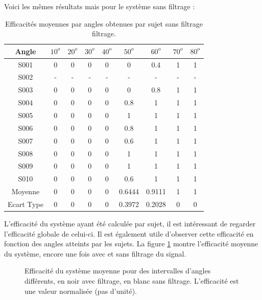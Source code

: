 \documentclass[letterpaper, twoside, 12pt, memoire, creativecommons, hyperref]{thETS}
\begin{document}
Voici les mêmes résultats mais pour le système sans filtrage :

\begin{table}[ht]
	\caption{Efficacités moyennes par angles obtenues par sujet sans filtrage filtrage. }
		\begin{tabular}{|c|c|c|c|c|c|c|c|c|}
		\hline
			Angle & $10^{o}$ & $20^{o}$ & $30^{o}$ & $40^{o}$ & $50^{o}$ & $60^{o}$ & $70^{o}$ & $80^{o}$\\
	    \hline
	    		S001 & 0 & 0 & 0 & 0 & 0 & 0.4 & 1 & 1\\
	    \hline
			S002 & - & - & - & - & - & - & - & -\\
	    \hline
	    		S003 & 0 & 0 & 0 & 0 & 0 & 0.8 & 1 & 1\\
	    \hline
	    		S004 & 0 & 0 & 0 & 0 & 0.8 & 1 & 1 & 1\\
	    \hline
	    		S005 & 0 & 0 & 0 & 0 & 1 & 1 & 1 & 1\\
	    \hline
	    		S006 & 0 & 0 & 0 & 0 & 0.8 & 1 & 1 & 1\\
	    \hline
	    		S007 & 0 & 0 & 0 & 0 & 0.6 & 1 & 1 & 1\\
	    \hline
	    		S008 & 0 & 0 & 0 & 0 & 1 & 1 & 1 & 1\\
	    \hline
	    		S009 & 0 & 0 & 0 & 0 & 1 & 1 & 1 & 1\\
	    \hline
	    		S010 & 0 & 0 & 0 & 0 & 0.6 & 1 & 1 & 1\\
	    \hline
	    		Moyenne & 0 & 0 & 0 & 0 & 0.6444 & 0.9111 & 1 & 1\\
	    \hline
	    		Ecart Type & 0 & 0 & 0 & 0 & 0.3972 & 0.2028 & 0 & 0\\
	    \hline
		\end{tabular}
	\label{tab:effFangles}
\end{table}

L'efficacité du système ayant été calculée par sujet, il est intéressant de regarder l'efficacité globale de celui-ci. Il est également utile d'observer cette efficacité en fonction des angles atteints par les sujets. La figure \ref{fig:compeff} montre l'efficacité moyenne du système, encore une fois avec et sans filtrage du signal. 

\begin{figure}
	\centering
	\caption{Efficacité du système moyenne pour des intervalles d'angles différents, en noir avec filtrage, en blanc sans filtrage. L'efficacité est une valeur normalisée (pas d'unité).}
	\label{fig:compeff}
\end{figure}
\end{document}
